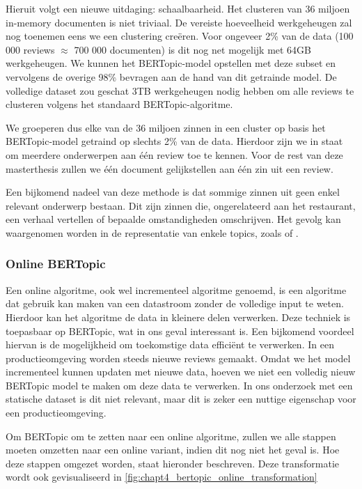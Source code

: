 Hieruit volgt een nieuwe uitdaging: schaalbaarheid. Het clusteren van 36 miljoen in-memory documenten is niet triviaal. De vereiste hoeveelheid werkgeheugen zal nog toenemen eens we een clustering creëren. Voor ongeveer 2\% van de data (100 000 reviews $\approx$ 700 000 documenten) is dit nog net mogelijk met 64GB werkgeheugen. We kunnen het BERTopic-model opstellen met deze subset en vervolgens de overige 98\% bevragen aan de hand van dit getrainde model.\newline
De volledige dataset zou geschat 3TB werkgeheugen nodig hebben om alle reviews te clusteren volgens het standaard BERTopic-algoritme.

We groeperen dus elke van de 36 miljoen zinnen in een cluster op basis het BERTopic-model getraind op slechts 2\% van de data. Hierdoor zijn we in staat om meerdere onderwerpen aan één review toe te kennen. Voor de rest van deze masterthesis zullen we één document gelijkstellen aan één zin uit een review.

Een bijkomend nadeel van deze methode is dat sommige zinnen uit geen enkel relevant onderwerp bestaan. Dit zijn zinnen die, ongerelateerd aan het restaurant, een verhaal vertellen of bepaalde omstandigheden omschrijven. Het gevolg kan waargenomen worden in de representatie van enkele topics, zoals  of .



\subsubsection{Online BERTopic}
Een online algoritme, ook wel incrementeel algoritme genoemd, is een algoritme dat gebruik kan maken van een datastroom zonder de volledige input te weten. Hierdoor kan het algoritme de data in kleinere delen verwerken. Deze techniek is toepasbaar op BERTopic, wat in ons geval interessant is. Een bijkomend voordeel hiervan is de mogelijkheid om toekomstige data efficiënt te verwerken. In een productieomgeving worden steeds nieuwe reviews gemaakt. Omdat we het model incrementeel kunnen updaten met nieuwe data, hoeven we niet een volledig nieuw BERTopic model te maken om deze data te verwerken.\newline
In ons onderzoek met een statische dataset is dit niet relevant, maar dit is zeker een nuttige eigenschap voor een productieomgeving.

Om BERTopic om te zetten naar een online algoritme, zullen we alle stappen moeten omzetten naar een online variant, indien dit nog niet het geval is. Hoe deze stappen omgezet worden, staat hieronder beschreven. Deze transformatie wordt ook gevisualiseerd in \autoref{fig:chapt4_bertopic_online_transformation}

